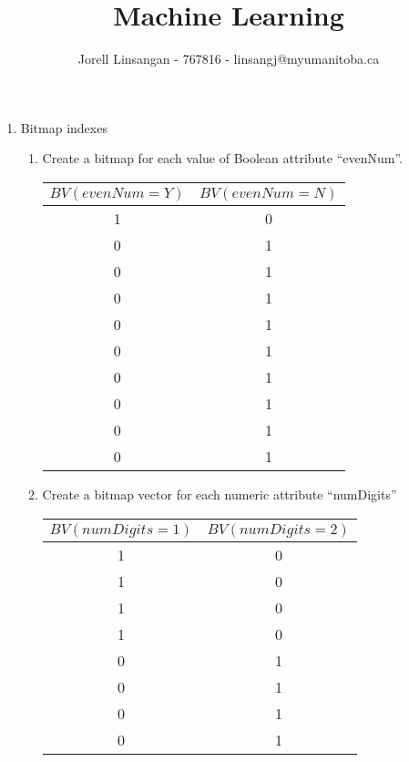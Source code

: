 \documentclass{report}
\begin{document}
	\rhead{\today}
	\title{Machine Learning}
	\author{Jorell Linsangan - 767816 - linsangj@myumanitoba.ca}
	\maketitle
	\newpage

	
	\rhead{\today}
	\pagestyle{fancyplain}

	\begin{enumerate}
		\item Bitmap indexes
		\begin{enumerate}
			\item Create a bitmap for each value of Boolean attribute ``evenNum''. \\ 
			\begin{center}
				\begin{tabular} {|c|c|}
					\hline
					$BV(evenNum = Y)$ & $BV(evenNum = N)$ \\ \hline
					1 & 0 \\ \hline
					0 & 1 \\ \hline
					0 & 1 \\ \hline
					0 & 1 \\ \hline
					0 & 1 \\ \hline
					0 & 1 \\ \hline
					0 & 1 \\ \hline
					0 & 1 \\ \hline
					0 & 1 \\ \hline
					0 & 1 \\ \hline
				\end{tabular}	
			\end{center}
			\item Create a bitmap vector for each numeric attribute ``numDigits'' \\
				\begin{center}
				\begin{tabular} {|c|c|}
					\hline
					$BV(numDigits = 1)$ & $BV(numDigits = 2)$ \\ \hline
					1 & 0 \\ \hline
					1 & 0 \\ \hline
					1 & 0 \\ \hline
					1 & 0 \\ \hline
					0 & 1 \\ \hline
					0 & 1 \\ \hline
					0 & 1 \\ \hline
					0 & 1 \\ \hline

\end{tabular}
\end{center}
\end{enumerate}
\end{enumerate}
\end{document}
